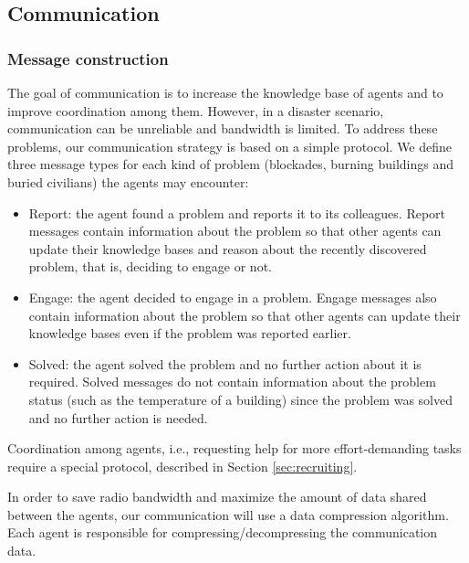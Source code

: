 \subsection{Communication}
\label{sec:communication}

\subsubsection{Message construction}
The goal of communication is to increase the knowledge base of agents and to improve coordination among them. However, in a disaster scenario, communication can be unreliable and bandwidth is limited. To address these problems, our communication strategy is based on a simple protocol. We define three message types for each kind of problem (blockades, burning buildings and buried civilians) the agents may encounter:

\begin{itemize}
 \item Report: the agent found a problem and reports it to its colleagues. Report messages contain information about the problem so that other agents can update their knowledge bases and reason about the recently discovered problem, that is, deciding to engage or not.

 \item Engage: the agent decided to engage in a problem. Engage messages also contain information about the problem so that other agents can update their knowledge bases even if the problem was reported earlier.

 \item Solved: the agent solved the problem and no further action about it is required. Solved messages do not contain information about the problem status (such as the temperature of a building) since the problem was solved and no further action is needed.
\end{itemize}

Coordination among agents, i.e., requesting help for more effort-demanding tasks require a special protocol, described in Section \ref{sec:recruiting}.

In order to save radio bandwidth and maximize the amount of data shared between the agents, our communication will use a data compression algorithm. Each agent is responsible for compressing/decompressing the communication data.

